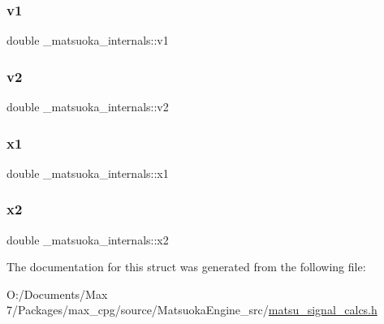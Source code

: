 \subsubsection{\texorpdfstring{v1}{v1}}
{\footnotesize\ttfamily double \+\_\+matsuoka\+\_\+internals\+::v1}

\mbox{\label{struct__matsuoka__internals_afb33a7237b71962822b08c2e53f724a1}} 
\subsubsection{\texorpdfstring{v2}{v2}}
{\footnotesize\ttfamily double \+\_\+matsuoka\+\_\+internals\+::v2}

\mbox{\label{struct__matsuoka__internals_a6f5497b0eabe8a0a644ef37b7db89baf}} 
\subsubsection{\texorpdfstring{x1}{x1}}
{\footnotesize\ttfamily double \+\_\+matsuoka\+\_\+internals\+::x1}

\mbox{\label{struct__matsuoka__internals_ab23ab0f50b3bb8250da083b0fd49cb05}} 
\subsubsection{\texorpdfstring{x2}{x2}}
{\footnotesize\ttfamily double \+\_\+matsuoka\+\_\+internals\+::x2}



The documentation for this struct was generated from the following file\+:\begin{DoxyCompactItemize}
\item 
O\+:/\+Documents/\+Max 7/\+Packages/max\+\_\+cpg/source/\+Matsuoka\+Engine\+\_\+src/\mbox{\hyperlink{matsu__signal__calcs_8h}{matsu\+\_\+signal\+\_\+calcs.\+h}}\end{DoxyCompactItemize}
